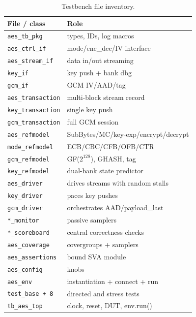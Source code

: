 \documentclass[conference,10pt,a4paper]{IEEEtran}
\begin{document}
\begin{table}[t]
\caption{Testbench file inventory.}
\label{tab:tb-files}
\centering
\small
\begin{tabular}{p{} p{}}
\toprule
\textbf{File / class} & \textbf{Role} \\
\midrule
\texttt{aes\_tb\_pkg}     & types, IDs, log macros \\
\texttt{aes\_ctrl\_if}    & mode/enc\_dec/IV interface \\
\texttt{aes\_stream\_if}  & data in/out streaming \\
\texttt{key\_if}          & key push + bank dbg \\
\texttt{gcm\_if}          & GCM IV/AAD/tag \\
\texttt{aes\_transaction} & multi-block stream record \\
\texttt{key\_transaction} & single key push \\
\texttt{gcm\_transaction} & full GCM session \\
\texttt{aes\_refmodel}    & SubBytes/MC/key-exp/encrypt/decrypt \\
\texttt{mode\_refmodel}   & ECB/CBC/CFB/OFB/CTR \\
\texttt{gcm\_refmodel}    & GF($2^{128}$), GHASH, tag \\
\texttt{key\_refmodel}    & dual-bank state predictor \\
\texttt{aes\_driver}      & drives streams with random stalls \\
\texttt{key\_driver}      & paces key pushes \\
\texttt{gcm\_driver}      & orchestrates AAD/payload\_last \\
\texttt{*\_monitor}       & passive samplers \\
\texttt{*\_scoreboard}    & central correctness checks \\
\texttt{aes\_coverage}    & covergroups + samplers \\
\texttt{aes\_assertions}  & bound SVA module \\
\texttt{aes\_config}      & knobs \\
\texttt{aes\_env}         & instantiation + connect + run \\
\texttt{test\_base + 8}   & directed and stress tests \\
\texttt{tb\_aes\_top}     & clock, reset, DUT, env.run() \\
\bottomrule
\end{tabular}
\end{table}
\end{document}
